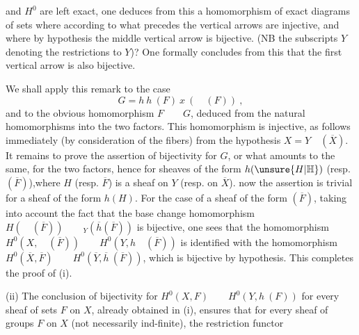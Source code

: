 
and $H^0$ are left exact, one deduces from this a homomorphism of exact diagrams of sets
where according to what precedes the vertical arrows are injective, and where by hypothesis the middle vertical arrow is bijective. (NB the subscripts $Y$ denoting the restrictions to $Y$)? One formally concludes from this that the first vertical arrow is also bijective.

We shall apply this remark to the case 
\[
G=h\ h\ (F)\ x\ (\quad(F))\ ,
\]
and to the obvious homomorphism $F\qquad G$, deduced from the natural homomorphisms into the two factors. This homomorphism is injective, as follows immediately (by consideration of the fibers) from the hypothesis $X=Y\quad(\overline{X})$. It remains to prove the assertion of bijectivity for $G$, or what amounts to the same, for the two factors, hence for sheaves of the form $h(\unsure{H|\mathbb{H}})$ (resp. $(\overline{F})$),where $H$ (resp. $\overline{F}$) is a sheaf on $Y$ (resp. on $\overline{X}$). now the assertion is trivial for a sheaf of the form $h(H)$. For the case of a sheaf of the form $(\overline{F})$, taking into account the fact that the base change homomorphism $H(\quad(\overline{F}))\qquad{}_{Y}(\overline{h}(\overline{F}))$ is bijective, one sees that the homomorphism $H^0(X,\quad(\overline{F}))\qquad H^0(Y,h\quad(\overline{F}))$ is identified with the homomorphism $H^0(\overline{X},\overline{F})\qquad H^0(\overline{Y},\overline{h}\ (\overline{F}))$, which is bijective by hypothesis. This completes the proof of (i).

(ii) The conclusion of bijectivity for $H^0(X,F)\qquad H^0(Y,h\ (F))$ \margin{\handwritten{$\unsure{\backslash|\checkmark}$}}for every sheaf of sets $F$ on $X$, already obtained in (i), ensures  that for every sheaf of groups $F$ on $X$ (not necessarily ind-finite), the restriction functor
